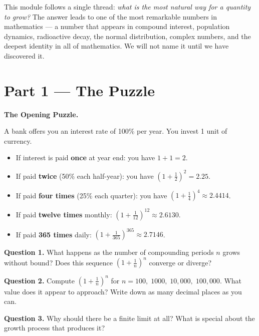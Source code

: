 \documentclass[12pt, a4paper]{article}
\begin{document}
\medskip
This module follows a single thread: \emph{what is the most natural way for a quantity to grow?} The answer leads to one of the most remarkable numbers in mathematics --- a number that appears in compound interest, population dynamics, radioactive decay, the normal distribution, complex numbers, and the deepest identity in all of mathematics. We will not name it until we have discovered it.

\newpage

\section{Part 1 \texorpdfstring{---}{--} The Puzzle}

\begin{puzzlebox}
\textbf{The Opening Puzzle.}

A bank offers you an interest rate of 100\% per year. You invest 1 unit of currency.

\begin{itemize}
  \item If interest is paid \textbf{once} at year end: you have $1 + 1 = 2$.
  \item If paid \textbf{twice} (50\% each half-year): you have $\left(1 + \tfrac{1}{2}\right)^2 = 2.25$.
  \item If paid \textbf{four times} (25\% each quarter): you have $\left(1 + \tfrac{1}{4}\right)^4 \approx 2.4414$.
  \item If paid \textbf{twelve times} monthly: $\left(1 + \tfrac{1}{12}\right)^{12} \approx 2.6130$.
  \item If paid \textbf{365 times} daily: $\left(1 + \tfrac{1}{365}\right)^{365} \approx 2.7146$.
\end{itemize}

\medskip
\textbf{Question 1.} What happens as the number of compounding periods $n$ grows without bound? Does this sequence $\left(1 + \tfrac{1}{n}\right)^n$ converge or diverge?

\textbf{Question 2.} Compute $\left(1 + \tfrac{1}{n}\right)^n$ for $n = 100,\; 1000,\; 10{,}000,\; 100{,}000$. What value does it appear to approach? Write down as many decimal places as you can.

\textbf{Question 3.} Why should there be a finite limit at all? What is special about the growth process that produces it?
\end{puzzlebox}
\end{document}
